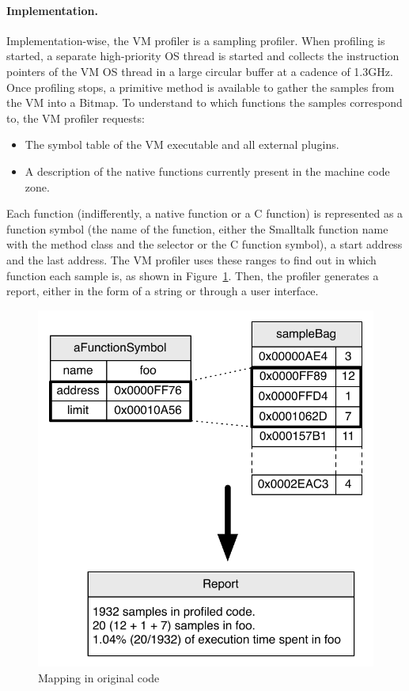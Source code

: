 \documentclass[10pt,preprint,nonatbib]{sigplanconf}
\newcommand{\figlabel}[1]{\label{fig:#1}}
\newcommand{\figref}[1]{Figure~\ref{fig:#1}}
\begin{document}
\paragraph{Implementation.} Implementation-wise, the VM profiler is a sampling profiler. When profiling is started, a separate high-priority OS thread is started and collects the instruction pointers of the VM OS thread in a large circular buffer at a cadence of 1.3GHz. Once profiling stops, a primitive method is available to gather the samples from the VM into a Bitmap. To understand to which functions the samples correspond to, the VM profiler requests:
\begin{itemize}
	\item The symbol table of the VM executable and all external plugins.
	\item A description of the native functions currently present in the machine code zone.
\end{itemize}
Each function (indifferently, a native function or a C function) is represented as a function symbol (the name of the function, either the Smalltalk function name with the method class and the selector or the C function symbol), a start address and the last address. The VM profiler uses these ranges to find out in which function each sample is, as shown in \figref{fig:OriginalMapping}. Then, the profiler generates a report, either in the form of a string or through a user interface.

 \begin{figure}[!htp]
     \begin{center}
         \includegraphics[width=0.9\linewidth]{OriginalMapping}
         \caption{Mapping in original code}
         \figlabel{fig:OriginalMapping}
     \end{center}
 \end{figure}
 
\end{document}
